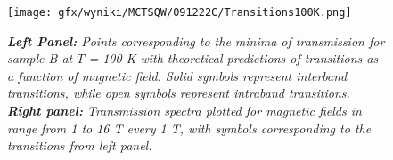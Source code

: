 \documentclass[titlepage,a4paper]{book}
\begin{document}
\begin{figure}[H]
	\centering
	\texttt{[image: gfx/wyniki/MCTSQW/091222C/Transitions100K.png]}
	\vspace{-10pt}
	\caption{\textit{\textbf{Left Panel:} Points corresponding to the minima of transmission for sample B at $T$ = 100 K with theoretical predictions of transitions as a function of magnetic field. Solid symbols represent interband transitions, while open symbols represent intraband transitions. \textbf{Right panel:} Transmission spectra plotted for magnetic fields in range from 1 to 16 T every 1 T, with symbols corresponding to the transitions from left panel.}}
	\label{fig:Summary_SQW_100K}
\end{figure}
\end{document}

